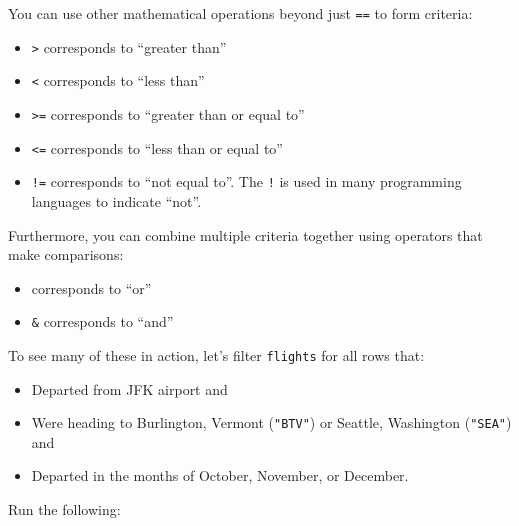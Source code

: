 \documentclass[12pt, krantz2,]{krantz}
\makeatletter
\newenvironment{Shaded}{\begin{snugshade}}{\end{snugshade}}
\newcommand{\DecValTok}[1]{\textcolor[rgb]{0.06,0.06,0.06}{#1}}
\newcommand{\KeywordTok}[1]{\textcolor[rgb]{0.27,0.27,0.27}{\textbf{#1}}}
\newcommand{\NormalTok}[1]{#1}
\newcommand{\OperatorTok}[1]{\textcolor[rgb]{0.43,0.43,0.43}{\textbf{#1}}}
\newcommand{\StringTok}[1]{\textcolor[rgb]{0.5,0.5,0.5}{#1}}
\providecommand{\tightlist}{%
  \setlength{\itemsep}{0pt}\setlength{\parskip}{0pt}}
\newenvironment{kframe}{%
\medskip{}
\setlength{\fboxsep}{.8em}
 \def\at@end@of@kframe{}%
 \ifinner\ifhmode%
  \def\at@end@of@kframe{\end{minipage}}%
  \begin{minipage}{\columnwidth}%
 \fi\fi%
 \def\FrameCommand##1{\hskip\@totalleftmargin \hskip-\fboxsep
 \colorbox{shadecolor}{##1}\hskip-\fboxsep
     \hskip-\linewidth \hskip-\@totalleftmargin \hskip\columnwidth}%
 \MakeFramed {\advance\hsize-\width
   \@totalleftmargin\z@ \linewidth\hsize
   \@setminipage}}%
 {\par\unskip\endMakeFramed%
 \at@end@of@kframe}
\renewenvironment{Shaded}{\begin{kframe}}{\end{kframe}}
\makeatother
\begin{document}
You can use other mathematical operations beyond just \texttt{==} to form criteria:

\begin{itemize}
\tightlist
\item
  \texttt{\textgreater{}} corresponds to ``greater than''
\item
  \texttt{\textless{}} corresponds to ``less than''
\item
  \texttt{\textgreater{}=} corresponds to ``greater than or equal to''
\item
  \texttt{\textless{}=} corresponds to ``less than or equal to''
\item
  \texttt{!=} corresponds to ``not equal to''. The \texttt{!} is used in many programming languages to indicate ``not''.
\end{itemize}

Furthermore, you can combine multiple criteria together using operators that make comparisons:

\begin{itemize}
\tightlist
\item
  \texttt{\textbar{}} corresponds to ``or''
\item
  \texttt{\&} corresponds to ``and''
\end{itemize}

To see many of these in action, let's filter \texttt{flights} for all rows that:

\begin{itemize}
\tightlist
\item
  Departed from JFK airport and
\item
  Were heading to Burlington, Vermont (\texttt{"BTV"}) or Seattle, Washington (\texttt{"SEA"}) and
\item
  Departed in the months of October, November, or December.
\end{itemize}

Run the following:

\begin{Shaded}
\end{Shaded}
\end{document}
